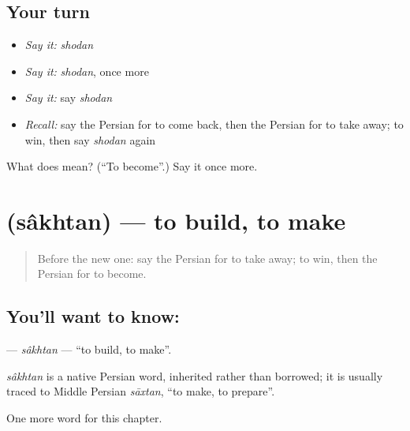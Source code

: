 \subsection*{Your turn}
\begin{itemize}
\raggedright
  \item \emph{Say it:} \emph{shodan}
  \item \emph{Say it:} \emph{shodan}, once more
  \item \emph{Say it:} say \emph{shodan}
  \item \emph{Recall:} say the Persian for to come back, then the Persian for to take away; to win, then say \emph{shodan} again
\end{itemize}

\begin{tcolorbox}[breakable,colback=teal!4,colframe=teal!35!black,title={Before you move on}]
What does  mean? (\textquotedblleft{}To become\textquotedblright{}.) Say it once more.
\end{tcolorbox}
\section[\texorpdfstring{\fa{ساختن} (sâkhtan)}{ساختن (sâkhtan)}]{ (sâkhtan) — to build, to make}

\label{lesson:FA-C40-sakhtan}



\begin{quote}
Before the new one: say the Persian for to take away; to win, then the Persian for to become.
\end{quote}

\subsection*{You'll want to know: }
\textbf{} — \emph{sâkhtan} — \textquotedblleft{}to build, to make\textquotedblright{}.

\begin{cousinweb}
\emph{sâkhtan} is a native Persian word, inherited rather than borrowed; it is usually traced to Middle Persian \emph{sāxtan}, \textquotedblleft{}to make, to prepare\textquotedblright{}.
\end{cousinweb}

\begin{grammarlens}[title={What you've built}]
One more word for this chapter.
\end{grammarlens}

